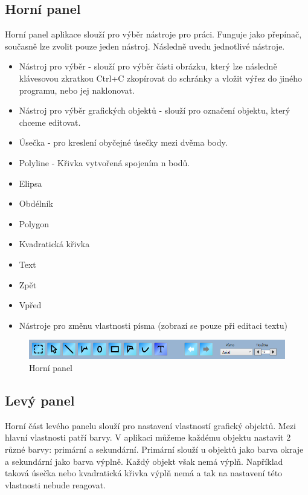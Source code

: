 \documentclass[
  field=inf,
  biblatex,
  glossaries,
  index
]{kidiplom}
\begin{document}
\subsection{Horní panel}
Horní panel aplikace slouží pro výběr nástroje pro práci. Funguje jako přepínač, současně lze zvolit pouze jeden nástroj. Následně uvedu jednotlivé nástroje.

\begin{itemize}
\item Nástroj pro výběr - slouží pro výběr části obrázku, který lze následně klávesovou zkratkou Ctrl+C zkopírovat do schránky a vložit výřez do jiného programu, nebo jej naklonovat.
\item Nástroj pro výběr grafických objektů - slouží pro označení objektu, který chceme editovat.
\item Úsečka - pro kreslení obyčejné úsečky mezi dvěma body.
\item Polyline - Křivka vytvořená spojením n bodů.
\item Elipsa
\item Obdélník
\item Polygon
\item Kvadratická křivka
\item Text
\item Zpět
\item Vpřed
\item Nástroje pro změnu vlastnosti písma (zobrazí se pouze při editaci textu)
\end{itemize}
\newpage
\begin{figure}
\includegraphics[width=16cm]{img/toppanel}
\caption{Horní panel}
\end{figure}


\subsection{Levý panel}

Horní část levého panelu slouží pro nastavení vlastností grafický objektů. Mezi hlavní vlastnosti patří barvy. V aplikaci můžeme každému objektu nastavit 2 různé barvy: primární a sekundární. Primární slouží u objektů jako barva okraje a sekundární jako barva výplně. Každý objekt však nemá výplň. Například taková úsečka nebo kvadratická křivka výplň nemá a tak na nastavení této vlastnosti nebude reagovat. 
\end{document}
